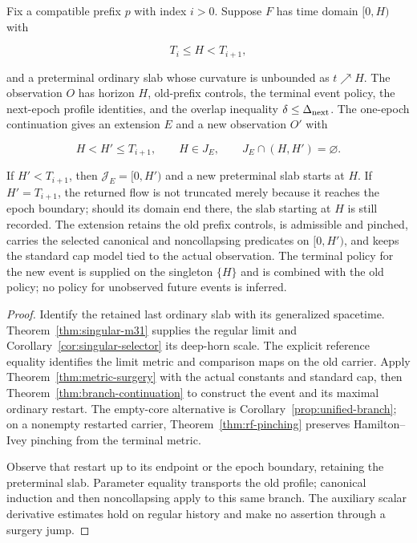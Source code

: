\begin{theorem}
\label{thm:global-epoch}

Fix a compatible prefix $p$ with index $i>0$.  Suppose $F$ has time domain
$[0,H)$ with

\[
 T_i\leq H<T_{i+1},
\]

and a preterminal ordinary slab whose curvature is unbounded as $t\nearrow H$.
The observation $O$ has horizon $H$, old-prefix controls, the terminal event
policy, the next-epoch profile identities, and the overlap inequality
$\delta\leq\Delta_{\rm next}$. The one-epoch continuation gives an extension
$E$ and a new observation $O'$ with

\begin{equation}
 H<H'\leq T_{i+1},\qquad H\in J_E,\qquad
 J_E\cap(H,H')=\varnothing.
 \label{eq:global-progress}
\end{equation}

If $H'<T_{i+1}$, then $\mathcal J_E=[0,H')$ and a new preterminal slab
starts at $H$.  If $H'=T_{i+1}$, the returned flow is not truncated merely
because it reaches the epoch boundary; should its domain end there, the slab
starting at $H$ is still recorded.  The extension retains the old prefix
controls, is admissible and pinched, carries the selected canonical and
noncollapsing predicates on $[0,H')$, and keeps the standard cap model tied to
the actual observation.  The terminal policy for the new event is supplied on
the singleton $\{H\}$ and is combined with the old policy; no policy for
unobserved future events is inferred.
\end{theorem}

\begin{proof}
Identify the retained last ordinary slab with its generalized spacetime.
Theorem~\ref{thm:singular-m31} supplies the regular limit and
Corollary~\ref{cor:singular-selector} its deep-horn scale. The explicit
reference equality identifies the limit metric and comparison maps on
the old carrier. Apply Theorem~\ref{thm:metric-surgery} with the actual
constants and standard cap, then Theorem~\ref{thm:branch-continuation}
to construct the event and its maximal ordinary restart.
The empty-core alternative is Corollary~\ref{prop:unified-branch}; on a
nonempty restarted carrier, Theorem~\ref{thm:rf-pinching} preserves
Hamilton--Ivey pinching from the terminal metric.

Observe that restart up to its endpoint or the epoch boundary, retaining
the preterminal slab. Parameter equality transports the old profile;
canonical induction and then noncollapsing apply to this same branch.
The auxiliary scalar derivative estimates hold on regular history and
make no assertion through a surgery jump.
\end{proof}

